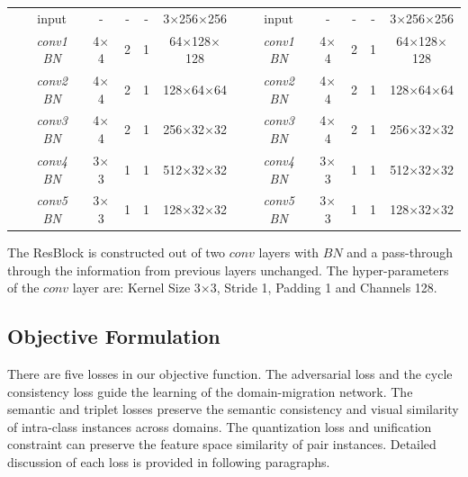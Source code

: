\documentclass[runningheads]{llncs}
\begin{document}
\begin{table}
\begin{center}
{\begin{tabular}{c|c|c|c|c|c||c|c|c|c|c|c}
&input &- &- &- &3$\times$256$\times$256 &
&input &- &- &- &3$\times$256$\times$256 \\  
&\emph{conv1 BN} &4$\times$4 &2 &1 &64$\times$128$\times$128 &&\emph{conv1 BN} &4$\times$4 &2 &1 &64$\times$128$\times$128 \\
&\emph{conv2 BN} &4$\times$4 &2 &1 &128$\times$64$\times$64 &&\emph{conv2 BN} &4$\times$4 &2 &1 &128$\times$64$\times$64 \\
&\emph{conv3 BN} &4$\times$4 &2 &1 &256$\times$32$\times$32 &&\emph{conv3 BN } &4$\times$4 &2 &1 &256$\times$32$\times$32 \\
&\emph{conv4 BN} &3$\times$3 &1 &1 &512$\times$32$\times$32 &&\emph{conv4 BN } &3$\times$3 &1 &1 &512$\times$32$\times$32 \\
&\emph{conv5 BN} &3$\times$3 &1 &1 &128$\times$32$\times$32 &&\emph{conv5 BN } &3$\times$3 &1 &1 &128$\times$32$\times$32 \\
\hline


\end{tabular}
}
\scriptsize
The ResBlock is constructed out of two $conv$ layers with $BN$ and a pass-through through the information from previous layers unchanged. The hyper-parameters of the $conv$ layer are: Kernel Size 3$\times$3, Stride 1, Padding 1 and Channels 128. 
\end{center}
\label{table:network}
\vspace{-5ex}
\end{table}

\subsection{Objective Formulation}
\label{sectin:3.3}
There are five losses in our objective function. The adversarial loss and the cycle consistency loss 
guide the learning of the domain-migration network. The semantic and triplet losses preserve the semantic consistency and visual similarity of intra-class instances across domains. The quantization loss and unification constraint can preserve the feature space similarity of pair instances. Detailed discussion of each loss is provided in following paragraphs.
\end{document}

